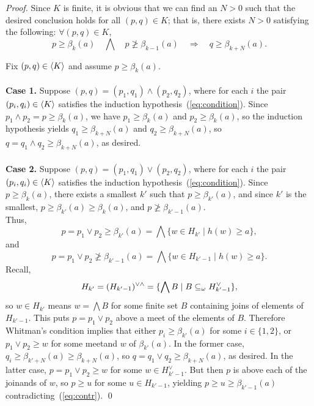 \begin{proof}
Since $K$ is finite, it is obvious that we can find an $N>0$ such that 
the desired conclusion holds for all $(p, q) \in K$; that is, there exists 
$N>0$ satisfying the following: $\forall (p,q) \in K$,
\begin{equation}
  \label{eq:condition}
  p\geq \beta_k (a) \quad \bigwedge  \quad 
p\ngeq \beta_{k-1}(a) \quad \Longrightarrow \quad q \geq \beta_{k+N}(a).
\end{equation}

\noindent Fix $(p,q) \in \langle K\rangle$ and assume $p \geq \beta_k(a)$.\\
\\
{\bf Case 1.} Suppose
$(p,q) = (p_1, q_1) \wedge (p_2, q_2)$,
where for each $i$ the pair $(p_i, q_i) \in \langle K\rangle$ satisfies the induction 
hypothesis~(\ref{eq:condition}).
Since $p_1  \wedge p_2 = p \geq \beta_k(a)$, we have $p_1 \geq \beta_k(a)$ and
$p_2 \geq \beta_k(a)$, so the induction hypothesis yields
$q_1 \geq \beta_{k+N}(a)$ and $q_2 \geq \beta_{k+N}(a)$, so 
$q = q_1 \wedge q_2 \geq \beta_{k+N}(a)$, as desired.\\
\\
{\bf Case 2.} Suppose 
$(p,q) = (p_1, q_1) \vee (p_2, q_2)$,
where for each $i$ the pair $(p_i, q_i) \in \langle K\rangle$ satisfies 
the induction hypothesis~(\ref{eq:condition}).
Since $p \geq \beta_k(a)$, there exists a smallest $k'$ such that 
$p \geq \beta_{k'}(a)$, and since $k'$ is the smallest,
$p \geq \beta_{k'}(a) \geq \beta_k(a)$, and $p \ngeq \beta_{k'-1}(a)$.\\
Thus, 
\[
p = p_1 \vee p_2 \geq \beta_{k'}(a) = \bigwedge \{w \in H_{k'} \mid h(w) \geq a\},
\]
and
\begin{equation}\label{eq:contr}
p = p_1 \vee p_2 \ngeq \beta_{k'-1}(a) = \bigwedge \{w \in H_{k'-1} \mid h(w) \geq a\}.
\end{equation}
Recall,
\[
H_{k'} = (H_{k'-1})^{\vee \wedge} = \{\bigwedge B \mid B \subseteq_{\omega} H_{k'-1}^{\vee}\},
\]
so $w \in H_{k'}$ means $w = \bigwedge B$ for some finite set $B$ containing 
joins of elements of $H_{k'-1}$. This puts $p = p_1 \vee p_2$ above a meet of the 
elements of $B$.
Therefore Whitman's condition implies that either $p_i \geq \beta_{k'}(a)$ for 
some $i \in \{1,2\}$,  or $p_1 \vee p_2 \geq w$ for some meetand $w$ of $\beta_{k'}(a)$.  
In the former case, $q_i \geq \beta_{k'+N}(a) \geq \beta_{k+N}(a)$,
so $q = q_1 \vee q_2 \geq \beta_{k+N}(a)$, as desired.  In the latter case,
$p = p_1 \vee p_2 \geq w$ for some $w \in H_{k'-1}^{\vee}$.  But then $p$ is above each 
of the joinands of $w$, so $p \geq u$ for some  $u \in H_{k'-1}$, yielding 
$p \geq u \geq \beta_{k'-1}(a)$ contradicting~(\ref{eq:contr}).
\qed



\end{proof}
